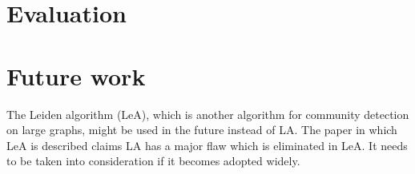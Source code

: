 \section{Evaluation}

\section{Future work}
The Leiden algorithm (LeA),  which is another algorithm for community detection on large graphs, might be used in the future instead of LA. The paper in which LeA is described claims LA has a major flaw which is eliminated in LeA. It needs to be taken into consideration if it becomes adopted widely. \cite{leidenAlgorithm}
